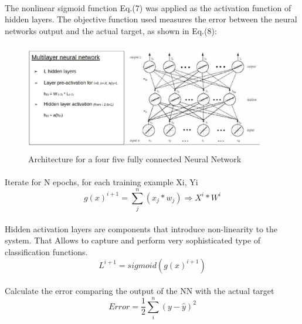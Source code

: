 \documentclass{llncs}       %
\begin{document}
\paragraph{}
The nonlinear sigmoid function Eq.(7) was applied as the activation function of hidden layers. The objective function used measures the error between the neural networks output and the actual target, as shown in Eq.(8): 

\begin{figure}[h]
\centering
\includegraphics[width=10.51cm,height=4.77cm]{media/deep-nn.eps}
\caption{Architecture for a four five fully connected 
Neural Network}
\end{figure}


\paragraph{}Iterate for N epochs,  for each training example Xi, Yi 
\begin{equation} 
g(x)^{i+1}=\sum_j^n(x_{j}*w_{j})\Rightarrow X^{i}*W^{i}
\end{equation}

\paragraph{}
Hidden activation layers are components that introduce non-linearity to 
the system. That Allows to capture and perform very sophisticated type 
of classification functions.
\begin{equation} 
L^{i+1}=sigmoid(g(x)^{i+1})
\end{equation}

\paragraph{}
\paragraph{}Calculate the error comparing the output of the NN with the actual target 
\begin{equation} 
Error = \frac{1}{2}\sum_i^n( y -\widehat{y})^2
\end{equation}
\end{document}
